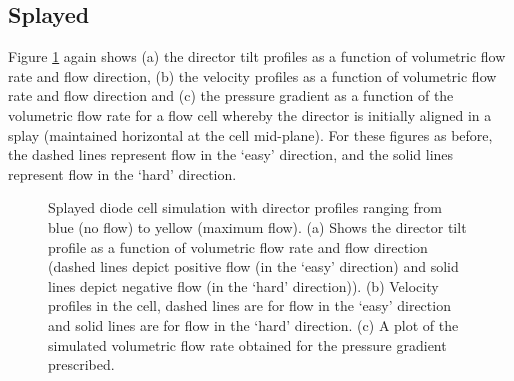 \subsection{Splayed}
Figure \ref{fig:diode_tilt} again shows (a) the director tilt profiles as a function of volumetric flow rate and flow direction, (b) the velocity profiles as a function of volumetric flow rate and flow direction and (c) the pressure gradient as a function of the volumetric flow rate for a flow cell whereby the director is initially aligned in a splay (maintained horizontal at the cell mid-plane). For these figures as before, the dashed lines represent flow in the `easy' direction, and the solid lines represent flow in the `hard' direction.

\begin{figure}
\begin{center}
\end{center}
\caption[Simulated tilt, velocity and pressure gradients for a tilted splayed cell]{\label{fig:diode_tilt} Splayed diode cell simulation with director profiles ranging from blue (no flow) to yellow (maximum flow). (a) Shows the director tilt profile as a function of volumetric flow rate and flow direction (dashed lines depict positive flow (in the `easy' direction) and solid lines depict negative flow (in the `hard' direction)). (b) Velocity profiles in the cell, dashed lines are for flow in the `easy' direction and solid lines are for flow in the `hard' direction. (c) A plot of the simulated volumetric flow rate obtained for the pressure gradient prescribed. }
\end{figure}

